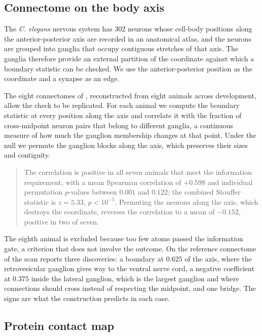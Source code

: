 \documentclass[11pt]{article}
\theoremstyle{definition}
\newcommand{\1}{\mathbf 1}\newcommand{\op}{\operatorname}
\begin{document}
\subsection{Connectome on the body axis}                   \label{sec:worm}

The \emph{C. elegans} nervous system has $302$ neurons whose cell-body
positions along the anterior-posterior axis are recorded in an anatomical
atlas, and the neurons are grouped into ganglia that occupy contiguous
stretches of that axis.  The ganglia therefore provide an external partition
of the coordinate against which a boundary statistic can be checked.  We use
the anterior-posterior position as the coordinate and a synapse as an edge.

The eight connectomes of \citet{witvliet2020}, reconstructed from eight
animals across development, allow the check to be replicated.  For each animal
we compute the boundary statistic at every position along the axis and
correlate it with the fraction of cross-midpoint neuron pairs that belong to
different ganglia, a continuous measure of how much the ganglion membership
changes at that point.  Under the null we permute the ganglion blocks along
the axis, which preserves their sizes and contiguity.

\begin{quote}
The correlation is positive in all seven animals that meet the information
requirement, with a mean Spearman correlation of $+0.598$ and individual
permutation $p$-values between $0.001$ and $0.122$; the combined Stouffer
statistic is $z=5.33$, $p<10^{-5}$.  Permuting the neurons along the axis,
which destroys the coordinate, reverses the correlation to a mean of $-0.152$,
positive in two of seven.
\end{quote}

The eighth animal is excluded because too few atoms passed the information
gate, a criterion that does not involve the outcome.  On the reference
connectome of \citet{white1986} the scan reports three discoveries: a boundary
at $0.625$ of the axis, where the retrovesicular ganglion gives way to the
ventral nerve cord, a negative coefficient at $0.375$ inside the lateral
ganglion, which is the largest ganglion and where connections should cross
instead of respecting the midpoint, and one bridge.  The signs are what the
construction predicts in each case.

\subsection{Protein contact map}           \label{sec:protein}
\end{document}
